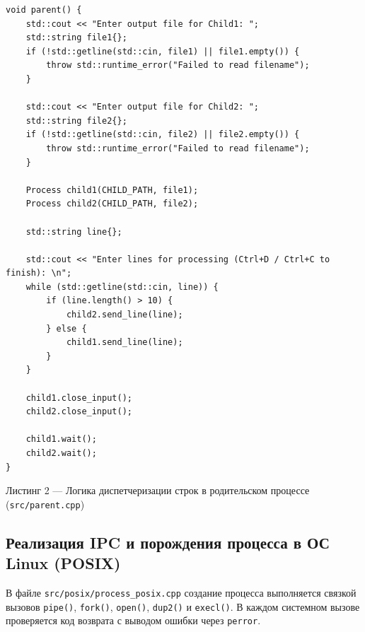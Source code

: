 \documentclass[11pt, a4paper]{article}
\begin{document}
\begin{lstlisting}
void parent() {
    std::cout << "Enter output file for Child1: ";
    std::string file1{};
    if (!std::getline(std::cin, file1) || file1.empty()) {
        throw std::runtime_error("Failed to read filename");
    }

    std::cout << "Enter output file for Child2: ";
    std::string file2{};
    if (!std::getline(std::cin, file2) || file2.empty()) {
        throw std::runtime_error("Failed to read filename");
    }

    Process child1(CHILD_PATH, file1);
    Process child2(CHILD_PATH, file2);

    std::string line{};
    
    std::cout << "Enter lines for processing (Ctrl+D / Ctrl+C to finish): \n";
    while (std::getline(std::cin, line)) {
        if (line.length() > 10) {
            child2.send_line(line);
        } else {
            child1.send_line(line);
        }
    }

    child1.close_input();
    child2.close_input();

    child1.wait();
    child2.wait();
}

\end{lstlisting}
\begin{center}
    \small Листинг 2 — Логика диспетчеризации строк в родительском процессе (\texttt{src/parent.cpp})
\end{center}

\subsection{Реализация IPC и порождения процесса в ОС Linux (POSIX)}
В файле \texttt{src/posix/process\_posix.cpp} создание процесса выполняется связкой вызовов \texttt{pipe()}, \texttt{fork()}, \texttt{open()}, \texttt{dup2()} и \texttt{execl()}. В каждом системном вызове проверяется код возврата с выводом ошибки через \texttt{perror}.
\end{document}
